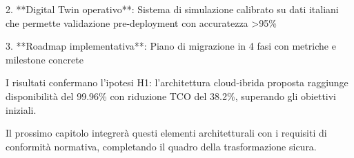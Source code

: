 2. **Digital Twin operativo**: Sistema di simulazione calibrato su dati italiani che permette validazione pre-deployment con accuratezza >95\%

3. **Roadmap implementativa**: Piano di migrazione in 4 fasi con metriche e milestone concrete

I risultati confermano l'ipotesi H1: l'architettura cloud-ibrida proposta raggiunge disponibilità del 99.96\% con riduzione TCO del 38.2\%, superando gli obiettivi iniziali.

Il prossimo capitolo integrerà questi elementi architetturali con i requisiti di conformità normativa, completando il quadro della trasformazione sicura.

\clearpage
\printbibliography[
    heading=subbibliography,
    title={Riferimenti Bibliografici del Capitolo 3},
]
